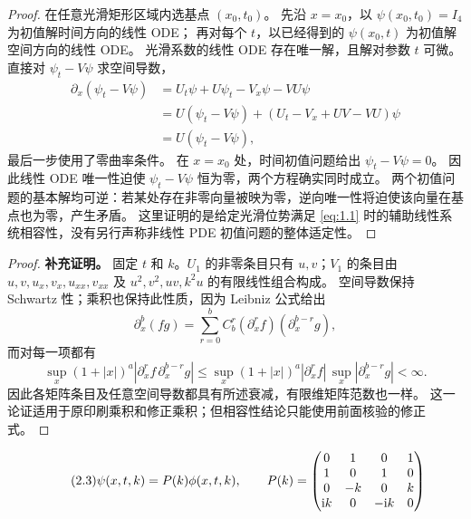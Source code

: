 \begin{proof}
在任意光滑矩形区域内选基点 $(x_0,t_0)$。
先沿 $x=x_0$，以 $\psi(x_0,t_0)=I_4$ 为初值解时间方向的线性 ODE；
再对每个 $t$，以已经得到的 $\psi(x_0,t)$ 为初值解空间方向的线性 ODE。
光滑系数的线性 ODE 存在唯一解，且解对参数 $t$ 可微。
直接对 $\psi_t-V\psi$ 求空间导数，
\begin{align*}
\partial_x(\psi_t-V\psi)
&=U_t\psi+U\psi_t-V_x\psi-VU\psi\\
&=U(\psi_t-V\psi)+(U_t-V_x+UV-VU)\psi\\
&=U(\psi_t-V\psi),
\end{align*}
最后一步使用了零曲率条件。
在 $x=x_0$ 处，时间初值问题给出 $\psi_t-V\psi=0$。
因此线性 ODE 唯一性迫使 $\psi_t-V\psi$ 恒为零，两个方程确实同时成立。
两个初值问题的基本解均可逆：若某处存在非零向量被映为零，逆向唯一性将迫使该向量在基点也为零，产生矛盾。
这里证明的是给定光滑位势满足 \eqref{eq:1.1} 时的辅助线性系统相容性，没有另行声称非线性 PDE 初值问题的整体适定性。
\end{proof}

\begin{proof}
\textbf{补充证明。}
固定 $t$ 和 $k$。$U_1$ 的非零条目只有 $u,v$；$V_1$ 的条目由
$u,v,u_x,v_x,u_{xx},v_{xx}$ 及 $u^2,v^2,uv,k^2u$ 的有限线性组合构成。
空间导数保持 Schwartz 性；乘积也保持此性质，因为 Leibniz 公式给出
\[
\partial_x^b(fg)=\sum\limits_{r=0}^b C_b^r
(\partial_x^rf)(\partial_x^{b-r}g),
\]
而对每一项都有
\[
\sup_x(1+|x|)^a|\partial_x^rf\,\partial_x^{b-r}g|
\le
\sup_x(1+|x|)^a|\partial_x^rf|\,
\sup_x|\partial_x^{b-r}g|<\infty.
\]
因此各矩阵条目及任意空间导数都具有所述衰减，有限维矩阵范数也一样。
这一论证适用于原印刷乘积和修正乘积；但相容性结论只能使用前面核验的修正式。
\end{proof}

\begin{equation}
\originaleq{2.3}
\psi(x,t,k)=P(k)\phi(x,t,k),\qquad
P(k)=\begin{pmatrix}
0&1&0&1\\1&0&1&0\\0&-k&0&k\\\ii k&0&-\ii k&0
\end{pmatrix}
\end{equation}


